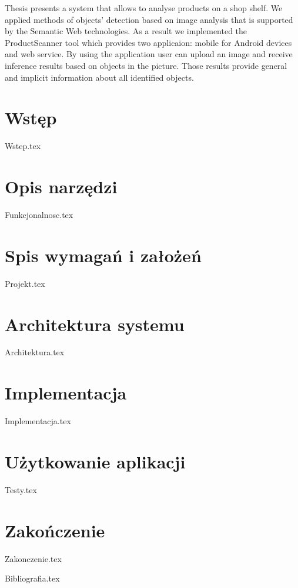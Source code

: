 \documentclass[12pt,a4paper,leqno,oneside,titlepage]{mwrep}
\begin{document}
Thesis  presents a system that allows to analyse products on a shop shelf. We applied methods of objects' detection based on image analysis that is supported by the Semantic Web technologies. As a result we implemented the ProductScanner tool which provides two applicaion: mobile for Android devices and web service. By using the application user can upload an image and receive inference results based on objects in the picture. Those results provide general and implicit information about all identified objects.

\tableofcontents

\chapter{Wstęp}
{Wstep.tex}

\chapter{Opis narzędzi}
{Funkcjonalnosc.tex}

\chapter{Spis wymagań i założeń}
{Projekt.tex}

\chapter{Architektura systemu}
{Architektura.tex}

\chapter{Implementacja}
{Implementacja.tex}

\chapter{Użytkowanie aplikacji}
{Testy.tex}

\chapter{Zakończenie}
{Zakonczenie.tex}

{Bibliografia.tex}
\end{document}
